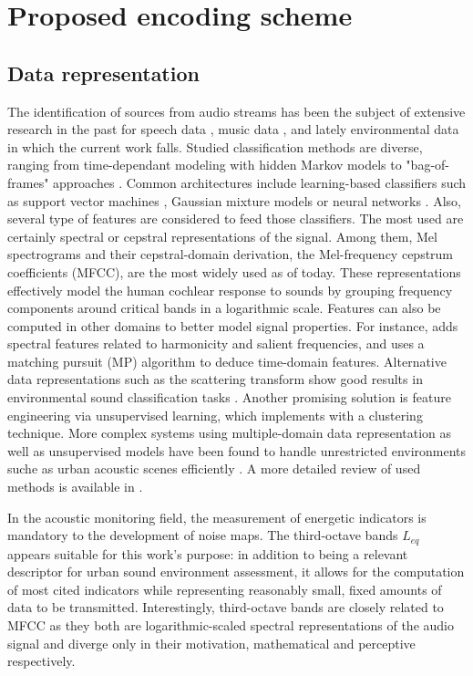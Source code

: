 \documentclass[sensors,article,submit,moreauthors,pdftex,10pt,a4paper]{mdpi}
\begin{document}
\section{Proposed encoding scheme} \label{sec:coder}

\subsection{Data representation}

The identification of sources from audio streams has been the subject of extensive research in the past for speech data \cite{anusuya2009}, music data \cite{tzanetakis2002}, and lately environmental data in which the current work falls. Studied classification methods are diverse, ranging from time-dependant modeling with hidden Markov models \cite{ntalampiras2014} to "bag-of-frames" approaches \cite{aucouturier2007, foggia2015}. Common architectures include learning-based classifiers such as support vector machines \cite{kumar2016}, Gaussian mixture models \cite{radhakrishnan2005} or neural networks \cite{salamon2017, piczak2015}. Also, several type of features are considered to feed those classifiers. The most used are certainly spectral \cite{khunarsal2013} or cepstral \cite{couvreur2004} representations of the signal. Among them, Mel spectrograms and their cepstral-domain derivation, the Mel-frequency cepstrum coefficients (MFCC), are the most widely used as of today. These representations effectively model the human cochlear response to sounds by grouping frequency components around critical bands in a logarithmic scale. Features can also be computed in other domains to better model signal properties. For instance, \cite{cai2006} adds spectral features related to harmonicity and salient frequencies, and \cite{chu2009} uses a matching pursuit (MP) algorithm to deduce time-domain features. Alternative data representations such as the scattering transform \cite{bauge2013} show good results in environmental sound classification tasks \cite{salamon2015}. Another promising solution is feature engineering via unsupervised learning, which \cite{salamon2015-2} implements with a clustering technique. More complex systems using multiple-domain data representation as well as unsupervised models have been found to handle unrestricted environments suche as urban acoustic scenes efficiently \citep{ntalampiras2012}. A more detailed review of used methods is available in \cite{chachada2013}.

In the acoustic monitoring field, the measurement of energetic indicators is mandatory to the development of noise maps. The third-octave bands $L_{eq}$ appears suitable for this work's purpose: in addition to being a relevant descriptor \cite{torija2013} for urban sound environment assessment, it allows for the computation of most cited indicators while representing reasonably small, fixed amounts of data to be transmitted. Interestingly, third-octave bands are closely related to MFCC as they both are logarithmic-scaled spectral representations of the audio signal and diverge only in their motivation, mathematical and perceptive respectively.
\end{document}
